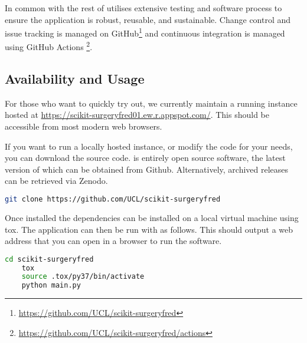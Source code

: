 In common with the rest of \sksurgery \fred utilises extensive testing and software process \cite{1398621} to 
ensure the application is robust, reusable, and sustainable\cite{VENTERS2018174}. Change control and issue tracking is managed
on GitHub\footnote{\href{https://github.com/UCL/scikit-surgeryfred}{https://github.com/UCL/scikit-surgeryfred}} and continuous integration is managed using
GitHub Actions \footnote{\href{https://github.com/UCL/scikit-surgeryfred/actions}{https://github.com/UCL/scikit-surgeryfred/actions}}.

\subsection{Availability and Usage}
For those who want to quickly try \fred out, we currently maintain a running instance hosted at \href{https://scikit-surgeryfred01.ew.r.appspot.com/}{https://scikit-surgeryfred01.ew.r.appspot.com/}. This should be accessible from most modern web browsers.

If you want to run a locally hosted instance, or modify the code for your needs, you can download the source code. \fred is entirely open source software, the latest version of which can be obtained from Github. Alternatively, archived releases can be retrieved via Zenodo\cite{stephen_thompson_2020_4314971}.

\begin{lstlisting}[language=bash]
	git clone https://github.com/UCL/scikit-surgeryfred
\end{lstlisting}

Once installed the dependencies can be installed on a local virtual machine using tox. The application can then be run with as follows. This should output a web address that you can open in a browser to run the software. 

\begin{lstlisting}[language=bash]
	cd scikit-surgeryfred
	tox
	source .tox/py37/bin/activate
	python main.py
\end{lstlisting}

